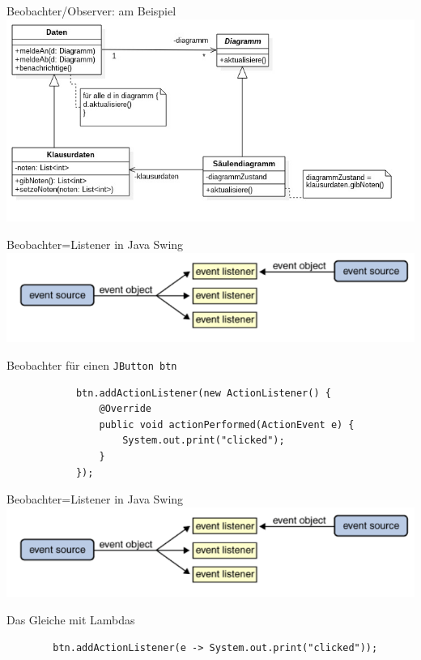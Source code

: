 \documentclass[18pt]{beamer}
\begin{document}
	\begin{frame}{Beobachter/Observer: am Beispiel}
		\includegraphics[keepaspectratio, width=\textwidth, height=\textheight]{pics/tut3/observer_example.jpg}
	\end{frame}

\begin{frame}[fragile]{Beobachter=Listener in Java Swing}
	\centering
	\includegraphics[scale=0.5]{pics/tut3/listener.png}
	\pause
	\begin{block}{Beobachter für einen \texttt{JButton btn}}
		\begin{verbatim}
			btn.addActionListener(new ActionListener() {
			    @Override
			    public void actionPerformed(ActionEvent e) {
			        System.out.print("clicked");
			    }
			});
		\end{verbatim}
	\end{block}
\end{frame}

\begin{frame}[fragile]{Beobachter=Listener in Java Swing}
	\centering
	\includegraphics[scale=0.5]{pics/tut3/listener.png}
	\begin{block}{Das Gleiche mit Lambdas}
		\begin{verbatim}
		btn.addActionListener(e -> System.out.print("clicked"));
		\end{verbatim}
	\end{block}
\end{frame}
\end{document}
